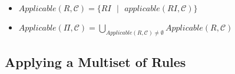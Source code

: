 \documentclass{article}
\newcommand{\s}{\text{ }}
\begin{document}
\begin{itemize} 
\item $Applicable(R,\mathcal{C}) = \{RI\s |\s applicable(RI,\mathcal{C})\}$
\item $Applicable(\Pi, \mathcal{C}) = \bigcup_{Applicable(R, \mathcal{C})\neq \emptyset} 
      Applicable(R,\mathcal{C})$
\end{itemize}


\subsection{Applying a Multiset of Rules}

\end{document}
